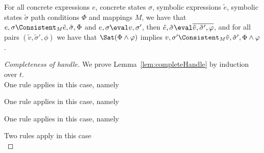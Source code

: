 \begin{lemma}
  \label{lem:completeEval}
  For all concrete expressions $e$, concrete states $\sigma$, symbolic expressions $\tilde{e}$, symbolic states $\tilde{\sigma}$ path conditions $\Phi$ and mappings $M$,
  we have that $e,\sigma\Consistent_{M}\tilde{e},\tilde{\sigma},\Phi$
  and $e,\sigma\eval v,\sigma'$,
  then $\tilde{e},\tilde{\sigma}\eval\overline{\tilde{v},\tilde{\sigma}',\phi}$,
  and for all pairs $(\tilde{v},\tilde{\sigma}',\phi)$ we have that $\Sat(\Phi\land\phi)$ implies $v,\sigma'\Consistent_{M}\tilde{v},\tilde{\sigma}',\Phi\land\phi$.
\end{lemma}

\begin{proof}[Completeness of handle]
  We prove Lemma~\ref{lem:completeHandle} by induction over $t$.\\

    {One rule applies in this case, namely \\

    }

    {One rule applies in this case, namely \\
    }

    {One rule applies in this case, namely \\
     }

    {Two rules apply in this case\\
      {
      }
      {
      }
    }



\end{proof}
